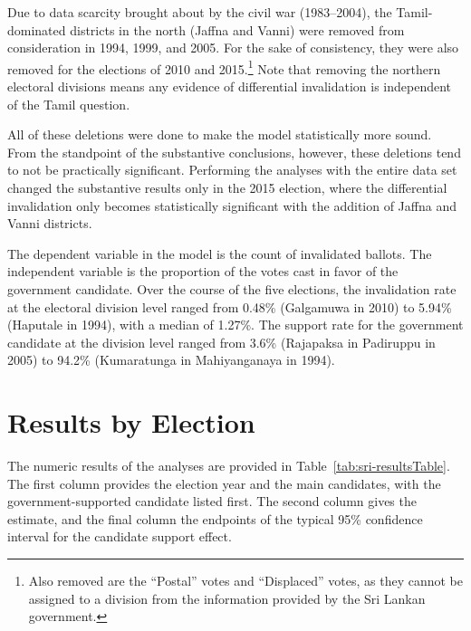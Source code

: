Due to data scarcity brought about by the civil war (1983--2004), the Tamil-dominated districts in the north (Jaffna and Vanni) were removed from consideration in 1994, 1999, and 2005. For the sake of consistency, they were also removed for the elections of 2010 and 2015.\footnote{Also removed are the ``Postal'' votes and ``Displaced'' votes, as they cannot be assigned to a division from the information provided by the Sri Lankan government.} Note that removing the northern electoral divisions means any evidence of differential invalidation is independent of the Tamil question.

All of these deletions were done to make the model statistically more sound. From the standpoint of the substantive conclusions, however, these deletions tend to not be practically significant. Performing the analyses with the entire data set changed the substantive results only in the 2015 election, where the differential invalidation only becomes statistically significant with the addition of Jaffna and Vanni districts.

The dependent variable in the model is the count of invalidated ballots. The independent variable is the proportion of the votes cast in favor of the government candidate. Over the course of the five elections, the invalidation rate at the electoral division level ranged from 0.48\% (Galgamuwa in 2010) to 5.94\% (Haputale in 1994), with a median of 1.27\%. The support rate for the government candidate at the division level ranged from 3.6\% (Rajapaksa in Padiruppu in 2005) to 94.2\% (Kumaratunga in Mahiyanganaya in 1994).











\section{Results by Election}
The numeric results of the analyses are provided in Table~\ref{tab:sri-resultsTable}. The first column provides the election year and the main candidates, with the government-supported candidate listed first. The second column gives the estimate, and the final column the endpoints of the typical 95\% confidence interval for the candidate support effect.


